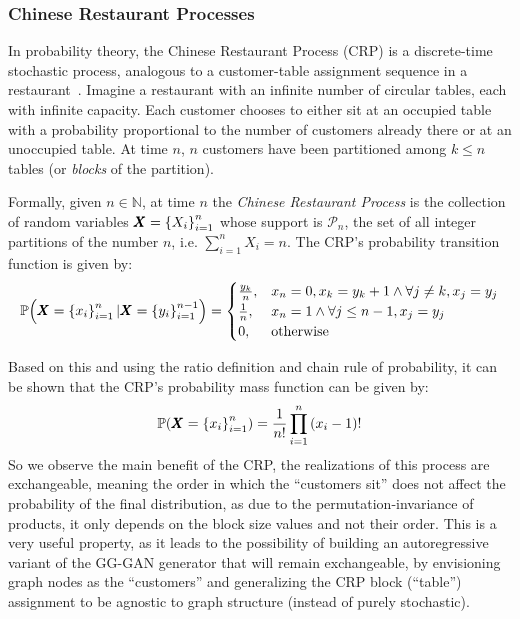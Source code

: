 \subsubsection{Chinese Restaurant Processes}
In probability theory, the Chinese Restaurant Process (CRP) is a discrete-time stochastic process, analogous to a customer-table assignment sequence in a restaurant~\cite{aldous_exchangeability_1985}. Imagine a restaurant with an infinite number of circular tables, each with infinite capacity. Each customer chooses to either sit at an occupied table with a probability proportional to the number of customers already there or at an unoccupied table. At time $n$, $n$ customers have been partitioned among $k \leq n$ tables (or \emph{blocks} of the partition).

\begin{definition}
    Formally, given $n \in \mathbb{N}$, at time $n$ the \emph{Chinese Restaurant Process} is the collection of random variables $\pmb{X}=\mathopen{}\left\{X_i\right\}_{i=1}^{n}$ whose support is $\mathcal{P}_n$, the set of all integer partitions of the number $n$, i.e. $\sum_{i=1}^{n}{X_i}=n$. The CRP's probability transition function is given by: 
\begin{equation}
\mathbb{P}\mathopen{}\left(\pmb{X}=\mathopen{}\left\{x_i\right\}_{i=1}^{n} \vert \pmb{X}=\mathopen{}\left\{y_i\right\}_{i=1}^{n-1}\right)
= \begin{cases} 
\frac{y_k}{n}, & x_n=0, x_k = y_k+1 \wedge \forall j \neq k, x_j=y_j \\
\frac{1}{n}, & x_n = 1 \wedge \forall j \leq n-1, x_j=y_j \\
0, & \text{otherwise} \end{cases}
\end{equation}
\end{definition}

Based on this and using the ratio definition and chain rule of probability, it can be shown that the CRP's probability mass function can be given by: 
\begin{equation}
\mathbb{P}\mathopen{}\left(\pmb{X}=\mathopen{}\left\{x_i\right\}_{i=1}^{n}\right) = \frac{1}{n!}\prod_{i=1}^{n}{\mathopen{}\left(x_i - 1\right)!}
\end{equation}
So we observe the main benefit of the CRP, the realizations of this process are exchangeable, meaning the order in which the \enquote{customers sit} does not affect the probability of the final distribution, as due to the permutation-invariance of products, it only depends on the block size values and not their order. This is a very useful property, as it leads to the possibility of building an autoregressive variant of the GG-GAN generator that will remain exchangeable, by envisioning graph nodes as the \enquote{customers} and generalizing the CRP block (\enquote{table}) assignment to be agnostic to graph structure (instead of purely stochastic).

